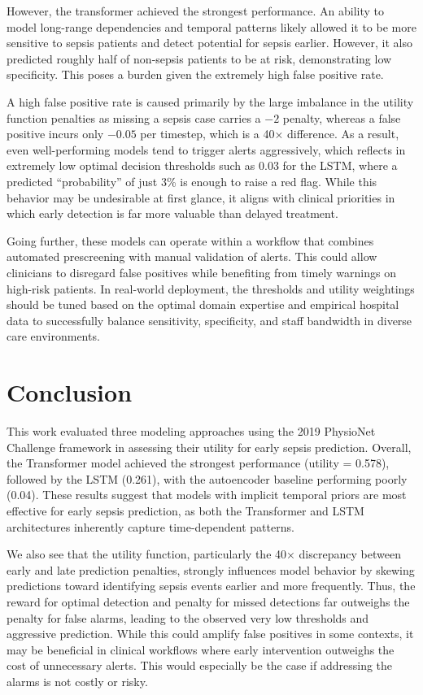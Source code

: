 \documentclass{article}
\theoremstyle{plain}
\theoremstyle{definition}
\theoremstyle{remark}
\begin{document}
However, the transformer achieved the strongest performance. An ability to model long-range dependencies and temporal patterns likely allowed it to be more sensitive to sepsis patients and detect potential for sepsis earlier. However, it also predicted roughly half of non-sepsis patients to be at risk, demonstrating low specificity. This poses a burden given the extremely high false positive rate.

A high false positive rate is caused primarily by the large imbalance in the utility function penalties as missing a sepsis case carries a $-2$ penalty, whereas a false positive incurs only $-0.05$ per timestep, which is a 40× difference. As a result, even well-performing models tend to trigger alerts aggressively, which reflects in extremely low optimal decision thresholds such as 0.03 for the LSTM, where a predicted “probability” of just 3\% is enough to raise a red flag. While this behavior may be undesirable at first glance, it aligns with clinical priorities in which early detection is far more valuable than delayed treatment.

Going further, these models can operate within a workflow that combines automated prescreening with manual validation of alerts. This could allow clinicians to disregard false positives while benefiting from timely warnings on high-risk patients. In real-world deployment, the thresholds and utility weightings should be tuned based on the optimal domain expertise and empirical hospital data to successfully balance sensitivity, specificity, and staff bandwidth in diverse care environments.

\section{Conclusion}

This work evaluated three modeling approaches using the 2019 PhysioNet Challenge framework in assessing their utility for early sepsis prediction. Overall, the Transformer model achieved the strongest performance (utility = 0.578), followed by the LSTM (0.261), with the autoencoder baseline performing poorly (0.04). These results suggest that models with implicit temporal priors are most effective for early sepsis prediction, as both the Transformer and LSTM architectures inherently capture time-dependent patterns.

We also see that the utility function, particularly the 40× discrepancy between early and late prediction penalties, strongly influences model behavior by skewing predictions toward identifying sepsis events earlier and more frequently. Thus, the reward for optimal detection and penalty for missed detections far outweighs the penalty for false alarms, leading to the observed very low thresholds and aggressive prediction. While this could amplify false positives in some contexts, it may be beneficial in clinical workflows where early intervention outweighs the cost of unnecessary alerts. This would especially be the case if addressing the alarms is not costly or risky.
\end{document}
